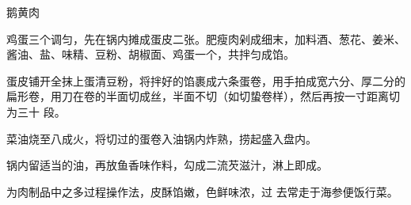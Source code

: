 \begin{recipe}{鹅黄肉}

\ingredients


\preparation

\step 鸡蛋三个调匀，先在锅内摊成蛋皮二张。肥瘦肉剁成细末，加料酒、葱花、姜米、
酱油、盐、味精、豆粉、胡椒面、鸡蛋一个，共拌匀成馅。

\step 蛋皮铺开全抹上蛋清豆粉，将拌好的馅裹成六条蛋卷，用手拍成宽六分、厚二分的
扁形卷，用刀在卷的半面切成丝，半面不切（如切蛰卷样），然后再按一寸距离切为三十
段。

\step 菜油烧至八成火，将切过的蛋卷入油锅内炸熟，捞起盛入盘内。

\step 锅内留适当的油，再放鱼香味作料，勾成二流芡滋汁，淋上即成。

\features

为肉制品中之多过程操作法，皮酥馅嫩，色鲜味浓，过 去常走于海参便饭行菜。

\end{recipe}


